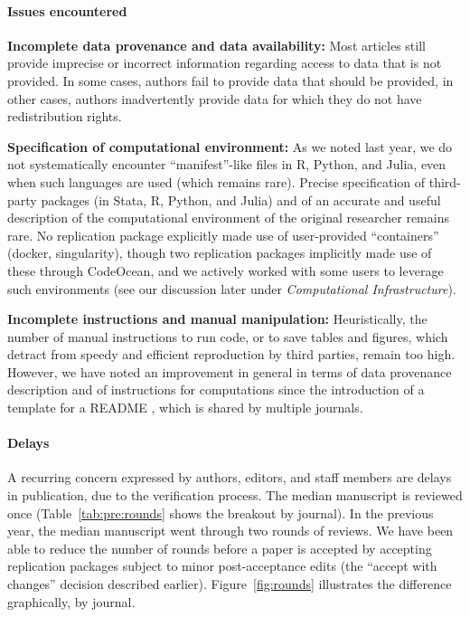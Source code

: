 \documentclass[PP]{AEA}
\renewcommand{\subparagraph}[1]{\textbf{#1}}
\begin{document}
\paragraph{Issues encountered}


\subparagraph{Incomplete data provenance and data availability:} Most articles still provide imprecise or incorrect information regarding access to data that is not provided. In some cases, authors fail to provide data that should be provided, in other cases, authors inadvertently provide data for which they do not have redistribution rights. 

\subparagraph{Specification of computational environment:}
As we noted last year, we do not systematically encounter  ``manifest''-like files in R, Python, and Julia, even when such languages are used (which remains rare). Precise specification of third-party packages (in Stata, R, Python, and Julia) and of an accurate and useful description of the computational environment of the original researcher remains rare. No replication package explicitly made use of user-provided ``containers'' (docker, singularity), though two replication packages implicitly made use of these through CodeOcean, and we actively worked with some users to leverage such environments (see our discussion later under \textit{Computational Infrastructure}).

\subparagraph{Incomplete instructions and manual manipulation:} Heuristically, the number of manual instructions to run code, or to save tables and figures, which detract from speedy and efficient reproduction by third parties, remain too high. However, we have noted an improvement in general in terms of data provenance description and of instructions for computations since the introduction of a template for a README \citep{READMEv1.0.0}, which is shared by multiple journals.


\paragraph{Delays} 

A recurring concern expressed by authors, editors, and staff members are delays in publication, due to the verification process. The median manuscript is reviewed once (Table~\ref{tab:pre:rounds} shows the breakout by journal). In the previous year, the median manuscript went through two rounds of reviews. 
 We have been able to reduce the number of rounds before a paper is accepted by accepting replication packages subject to minor post-acceptance edits (the ``accept with changes'' decision described earlier). Figure~\ref{fig:rounds} illustrates the difference graphically, by journal.
\end{document}
